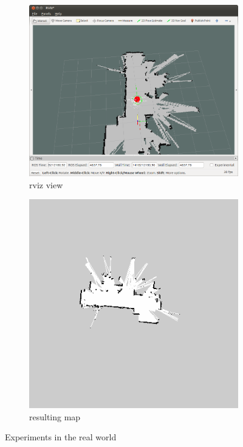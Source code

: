 \documentclass[a4paper]{article}
\begin{document}
\begin{figure}[h!]
  \centering
  \begin{subfigure}[b]{0.8\textwidth}
    \includegraphics[width=\textwidth,height=\textheight,keepaspectratio]{img/navigation_real_rviz.png}
    \caption{rviz view}
  \end{subfigure}
  \begin{subfigure}[b]{0.8\textwidth}
    \includegraphics[width=\textwidth,height=\textheight,keepaspectratio]{img/gmapping_real_map.png}
    \caption{resulting map}
  \end{subfigure}
  \caption{Experiments in the real world}
  \label{fig:navigationresults}
\end{figure}
\end{document}
